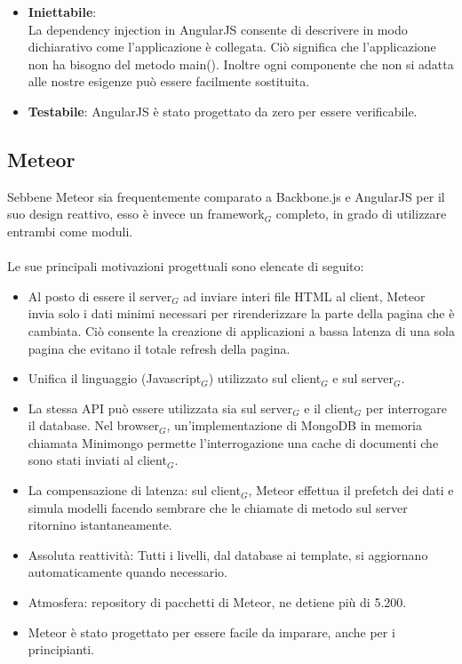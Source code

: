 \begin{itemize}
	\item \textbf{ Iniettabile}:\\
	La dependency injection in AngularJS consente di descrivere in modo dichiarativo come l'applicazione è collegata. Ciò significa che l'applicazione non ha bisogno del metodo main(). Inoltre ogni componente che non si adatta alle nostre esigenze può essere facilmente sostituita.
	\item \textbf{ Testabile}:
	AngularJS è stato progettato da zero per essere verificabile.
\end{itemize}

\subsection{Meteor}

Sebbene Meteor sia frequentemente comparato a Backbone.js e AngularJS per il suo design reattivo, esso è invece un framework$_G$ completo, in grado di utilizzare entrambi come moduli.\\
\\
Le sue principali motivazioni progettuali sono elencate di seguito:

\begin{itemize}
	\item Al posto di essere il server$_G$ ad inviare interi file HTML al client, Meteor invia solo i dati minimi necessari per rirenderizzare la parte della pagina che è cambiata. Ciò consente la creazione di applicazioni a bassa latenza di una sola pagina che evitano il totale refresh della pagina.
	\item Unifica il linguaggio (Javascript$_G$) utilizzato sul client$_G$ e sul server$_G$.
	\item La stessa API può essere utilizzata sia sul server$_G$ e il client$_G$ per interrogare il database.
	Nel browser$_G$, un'implementazione di MongoDB in memoria chiamata Minimongo permette l'interrogazione una cache di documenti che sono stati inviati al client$_G$. 
	\item La compensazione di latenza: sul client$_G$, Meteor effettua il prefetch dei dati e simula modelli facendo sembrare che le chiamate di metodo sul server ritornino istantaneamente.
	\item Assoluta reattività: Tutti i livelli, dal database ai template, si aggiornano automaticamente quando necessario.
	\item Atmosfera: repository di pacchetti di Meteor, ne detiene più di 5.200.
	\item Meteor è stato progettato per essere facile da imparare, anche per i principianti.
\end{itemize}

